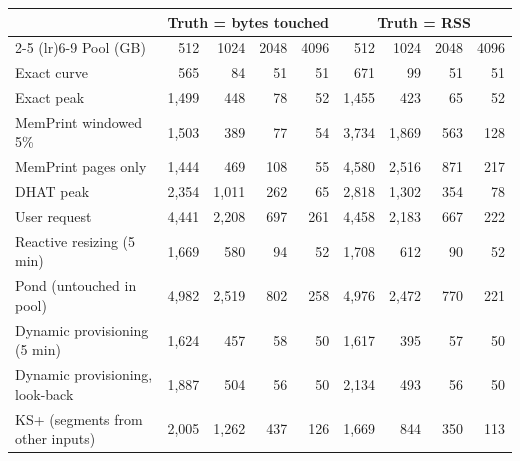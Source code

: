 \begin{tabular}{lrrrrrrrr}
\toprule
 & \multicolumn{4}{c}{Truth = bytes touched} & \multicolumn{4}{c}{Truth = RSS} \\
\cmidrule(lr){2-5} \cmidrule(lr){6-9}
Pool (GB) & 512 & 1024 & 2048 & 4096 & 512 & 1024 & 2048 & 4096 \\
\midrule
Exact curve & 565 & 84 & 51 & 51 & 671 & 99 & 51 & 51 \\
Exact peak & 1{,}499 & 448 & 78 & 52 & 1{,}455 & 423 & 65 & 52 \\
MemPrint windowed 5\% & 1{,}503 & 389 & 77 & 54 & 3{,}734 & 1{,}869 & 563 & 128 \\
MemPrint pages only & 1{,}444 & 469 & 108 & 55 & 4{,}580 & 2{,}516 & 871 & 217 \\
DHAT peak & 2{,}354 & 1{,}011 & 262 & 65 & 2{,}818 & 1{,}302 & 354 & 78 \\
User request & 4{,}441 & 2{,}208 & 697 & 261 & 4{,}458 & 2{,}183 & 667 & 222 \\
Reactive resizing (5 min) & 1{,}669 & 580 & 94 & 52 & 1{,}708 & 612 & 90 & 52 \\
Pond (untouched in pool) & 4{,}982 & 2{,}519 & 802 & 258 & 4{,}976 & 2{,}472 & 770 & 221 \\
Dynamic provisioning (5 min) & 1{,}624 & 457 & 58 & 50 & 1{,}617 & 395 & 57 & 50 \\
Dynamic provisioning, look-back & 1{,}887 & 504 & 56 & 50 & 2{,}134 & 493 & 56 & 50 \\
KS+ (segments from other inputs) & 2{,}005 & 1{,}262 & 437 & 126 & 1{,}669 & 844 & 350 & 113 \\
\bottomrule
\end{tabular}
